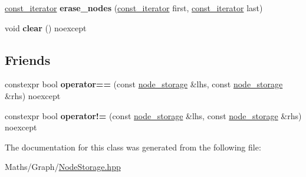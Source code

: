 \begin{DoxyCompactItemize}
\item 
\mbox{\label{classsequoia_1_1maths_1_1graph__impl_1_1node__storage_a05e850391059a7b5b3c3be0203ea53eb}} 
\mbox{\hyperlink{classsequoia_1_1utilities_1_1iterator}{const\+\_\+iterator}} {\bfseries erase\+\_\+nodes} (\mbox{\hyperlink{classsequoia_1_1utilities_1_1iterator}{const\+\_\+iterator}} first, \mbox{\hyperlink{classsequoia_1_1utilities_1_1iterator}{const\+\_\+iterator}} last)
\item 
\mbox{\label{classsequoia_1_1maths_1_1graph__impl_1_1node__storage_a465ab00c3b8138fc2f678de2efd2db74}} 
void {\bfseries clear} () noexcept
\end{DoxyCompactItemize}
\subsection*{Friends}
\begin{DoxyCompactItemize}
\item 
\mbox{\label{classsequoia_1_1maths_1_1graph__impl_1_1node__storage_aab0b13348ec1d1b0b1854f973df03fa4}} 
constexpr bool {\bfseries operator==} (const \mbox{\hyperlink{classsequoia_1_1maths_1_1graph__impl_1_1node__storage}{node\+\_\+storage}} \&lhs, const \mbox{\hyperlink{classsequoia_1_1maths_1_1graph__impl_1_1node__storage}{node\+\_\+storage}} \&rhs) noexcept
\item 
\mbox{\label{classsequoia_1_1maths_1_1graph__impl_1_1node__storage_a1853c1cd89d0f87d543f7772d871f39b}} 
constexpr bool {\bfseries operator!=} (const \mbox{\hyperlink{classsequoia_1_1maths_1_1graph__impl_1_1node__storage}{node\+\_\+storage}} \&lhs, const \mbox{\hyperlink{classsequoia_1_1maths_1_1graph__impl_1_1node__storage}{node\+\_\+storage}} \&rhs) noexcept
\end{DoxyCompactItemize}


The documentation for this class was generated from the following file\+:\begin{DoxyCompactItemize}
\item 
Maths/\+Graph/\mbox{\hyperlink{_node_storage_8hpp}{Node\+Storage.\+hpp}}\end{DoxyCompactItemize}
